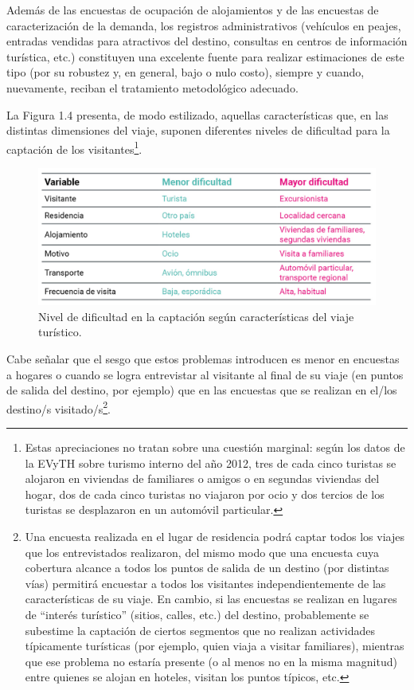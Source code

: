 \documentclass[
  openany]{book}
\begin{document}
Además de las encuestas de ocupación de alojamientos y de las encuestas de caracterización de la demanda, los registros administrativos (vehículos en peajes, entradas vendidas para atractivos del destino, consultas en centros de información turística, etc.) constituyen una excelente fuente para realizar estimaciones de este tipo (por su robustez y, en general, bajo o nulo costo), siempre y cuando, nuevamente, reciban el tratamiento metodológico adecuado.

La Figura 1.4 presenta, de modo estilizado, aquellas características que, en las distintas dimensiones del viaje, suponen diferentes niveles de dificultad para la captación de los visitantes\footnote{Estas apreciaciones no tratan sobre una cuestión marginal: según los datos de la EVyTH sobre turismo interno del año 2012, tres de cada cinco turistas se alojaron en viviendas de familiares o amigos o en segundas viviendas del hogar, dos de cada cinco turistas no viajaron por ocio y dos tercios de los turistas se desplazaron en un automóvil particular.}.

\begin{figure}

{\centering \includegraphics[width=1\linewidth]{imagenes/figura1.4} 

}

\caption{Nivel de dificultad en la captación según características del viaje turístico.}\label{fig:dificultad}
\end{figure}

Cabe señalar que el sesgo que estos problemas introducen es menor en encuestas a hogares o cuando se logra entrevistar al visitante al final de su viaje (en puntos de salida del destino, por ejemplo) que en las encuestas que se realizan en el/los destino/s visitado/s\footnote{Una encuesta realizada en el lugar de residencia podrá captar todos los viajes que los entrevistados realizaron, del mismo modo que una encuesta cuya cobertura alcance a todos los puntos de salida de un destino (por distintas vías) permitirá encuestar a todos los visitantes independientemente de las características de su viaje. En cambio, si las encuestas se realizan en lugares de ``interés turístico'' (sitios, calles, etc.) del destino, probablemente se subestime la captación de ciertos segmentos que no realizan actividades típicamente turísticas (por ejemplo, quien viaja a visitar familiares), mientras que ese problema no estaría presente (o al menos no en la misma magnitud) entre quienes se alojan en hoteles, visitan los puntos típicos, etc.}.
\end{document}
